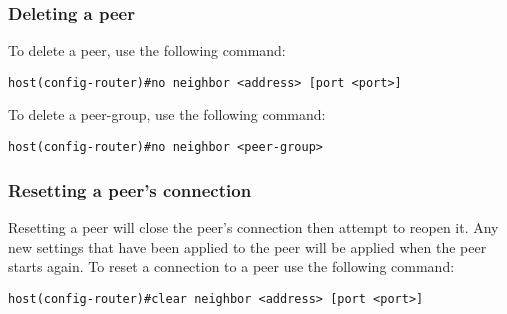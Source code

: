 
\subsubsection{Deleting a peer}
\label{sec:configure:peers:delete}

To delete a peer, use the following command: \\

\begin{Verbatim}[frame=single]
host(config-router)#no neighbor <address> [port <port>]
\end{Verbatim}

\noindent To delete a peer-group, use the following command:\\

\begin{Verbatim}[frame=single]
host(config-router)#no neighbor <peer-group>
\end{Verbatim}


\subsubsection{Resetting a peer's connection}
\label{sec:configure:peers:reset}

Resetting a peer will close the peer's connection then attempt to reopen it.  Any new settings that have been applied to the peer will be applied when the peer starts again.  To reset a connection to a peer use the following command:\\

\begin{Verbatim}[frame=single]
host(config-router)#clear neighbor <address> [port <port>]
\end{Verbatim}
